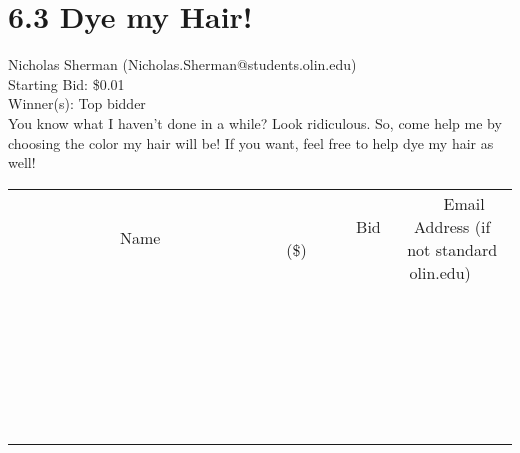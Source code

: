 \documentclass[11pt]{article}
\begin{document}
\section*{6.3 Dye my Hair!}
Nicholas Sherman (Nicholas.Sherman@students.olin.edu) \\
Starting Bid: \$0.01 \\
Winner(s): 
Top bidder \\
You know what I haven't done in a while? Look ridiculous. So, come help me by choosing the color my hair will be! If you want, feel free to help dye my hair as well! \\[6ex]
\begin{tabular}{c c c}
~~~~~~~~~~~~~Name~~~~~~~~~~~~~ & ~~~~~~~~~Bid (\$)~~~~~~~~~ & ~~~Email Address (if not standard olin.edu)~~~ \\
 & & \\
\hline
 & & \\
\hline
 & & \\
\hline
 & & \\
\hline
 & & \\
\hline
 & & \\
\hline
 & & \\
\hline
 & & \\
\hline
 & & \\
\hline
 & & \\
\hline
 & & \\
\hline
 & & \\
\hline
 & & \\
\hline
 & & \\
\hline
 & & \\
\hline
 & & \\
\hline
 & & \\
\hline
 & & \\
\hline
 & & \\
\hline
 & & \\
\hline
 & & \\
\hline
 & & \\
\hline
 & & \\
\hline
 & & \\
\hline
 & & \\
\hline
 & & \\
\hline
\end{tabular}
\clearpage
\end{document}
